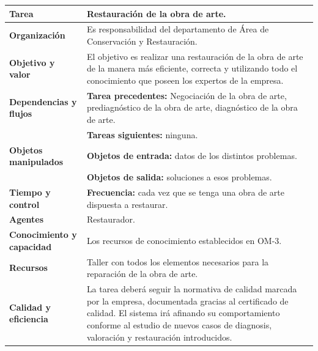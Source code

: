 \documentclass[a4paper,11pt]{article}
\begin{document}
			\begin{center}
				\begin{tabular}{| l | p{6.5cm} |}
					\hline
					\textbf{Tarea} & Restauración de la obra de arte.\\
					\hline
					\textbf{Organización} & Es responsabilidad del departamento de Área de
					Conservación y Restauración.\\
					\hline
					\textbf{Objetivo y valor} & El objetivo es realizar una restauración de la
					obra de arte de la manera más eficiente, correcta y utilizando todo el conocimiento que poseen los expertos de la empresa.\\
					\hline
					\textbf{Dependencias y flujos} & \textbf{Tarea precedentes:} Negociación de
					la obra de arte, prediagnóstico de la obra de arte, diagnóstico de la obra de arte.\\
					& \textbf{Tareas siguientes:} ninguna.\\
					\hline
					\textbf{Objetos manipulados} & \textbf{Objetos de entrada:} datos de los
					distintos problemas.\\
					& \textbf{Objetos de salida:} soluciones a esos problemas.\\
					\hline
					\textbf{Tiempo y control} & \textbf{Frecuencia:} cada vez que se tenga una
					obra de arte dispuesta a restaurar.\\
					\hline
					\textbf{Agentes} & Restaurador.\\
					\hline
					\textbf{Conocimiento y capacidad} & Los recursos de conocimiento
					establecidos en OM-3.\\
					\hline
					\textbf{Recursos} & Taller con todos los elementos necesarios para la
					reparación de la obra de arte.\\
					\hline
					\textbf{Calidad y eficiencia} & La tarea deberá seguir la normativa de
					calidad marcada por la empresa, documentada gracias al certificado de calidad. El sistema irá afinando su comportamiento conforme al estudio de nuevos casos de diagnosis, valoración y restauración introducidos.\\
					\hline
				\end{tabular}
			\end{center}
			\newpage
\end{document}
